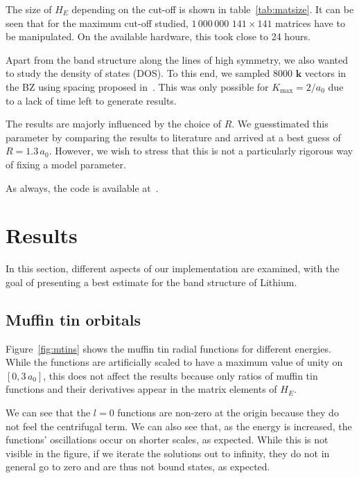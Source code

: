 \documentclass[a4paper,DIV=12,english]{scrartcl}
\begin{document}
The size of $H_E$ depending on the cut-off is shown in table~\ref{tab:matsize}. It can be seen that for the maximum cut-off studied, $1\,000\,000$ $141\times141$ matrices have to be manipulated. On the available hardware, this took close to 24 hours.

Apart from the band structure along the lines of high symmetry, we also wanted to study the density of states (DOS). To this end, we sampled $8000$ $\textbf{k}$ vectors in the BZ using spacing proposed in~\cite{bzpoints}. This was only possible for $K_\text{max} = 2/a_0$ due to a lack of time left to generate results.

The results are majorly influenced by the choice of $R$. We guesstimated this parameter by comparing the results to literature and arrived at a best guess of $R=1.3\,a_0$. However, we wish to stress that this is not a particularly rigorous way of fixing a model parameter.

As always, the code is available at~\cite{github}.

\FloatBarrier
\section{Results}
In this section, different aspects of our implementation are examined, with the goal of presenting a best estimate for the band structure of Lithium.

\subsection{Muffin tin orbitals}
Figure~\ref{fig:mtins} shows the muffin tin radial functions for different energies. While the functions are artificially scaled to have a maximum value of unity on $[0, 3\,a_0]$, this does not affect the results because only ratios of muffin tin functions and their derivatives appear in the matrix elements of $H_E$. 

We can see that the $l=0$ functions are non-zero at the origin because they do not feel the centrifugal term. We can also see that, as the energy is increased, the functions' oscillations occur on shorter scales, as expected. While this is not visible in the figure, if we iterate the solutions out to infinity, they do not in general go to zero and are thus not bound states, as expected.
\end{document}
